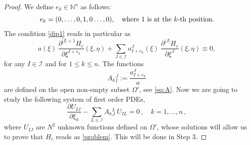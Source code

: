 \documentclass{article}
\newcommand{\I}{\mathcal{I}}
\newcommand{\de}{\partial}
\newcommand{\N}{\mathds{N}}
\begin{document}
\begin{proof}
\smallskip\noindent
We define $e_k\in\N^n$ as follows:
$$e_k=(0,\mathellipsis,0,1,0\mathellipsis,0),\quad \text{where $1$ is at the $k$-th position}.$$
The condition \eqref{dip1} reads in particular as 
\begin{equation}\label{dip}
a(\xi)\ \frac{\de^{|I|+1}H_c}{{\de\xi^{I+e_k}}}(\xi,\eta) + \sum_{J\in\mathcal{I}} a^J_{I+e_k}(\xi)\   \frac{\de^{|J|}H_c}{\de\xi^{J}} (\xi,\eta) \equiv 0,\end{equation}
for any $I\in\I$ and  for   $1\leq k \leq n$.
The functions 
$$
A_k{}^J_I:=\frac{a^J_{I+e_k}}{a}
$$
are defined on the open non-empty subset $\Omega'$, see \eqref{eq:A}.
Now we are going to study the following system of first order PDEs,
\begin{equation}\label{sistema}
\frac{\de U_{IJ}}{\de\xi_k}-\sum_{L\in\I}A_k{}^L_J \, U_{IL}=0\,,\quad k=1,\dots,n\,,
\end{equation}
where $U_{IJ}$ are $N^2$ unknown functions defined on $\Omega'$, whose solutions will allow us to prove that $H_c$ reads as \eqref{problem}.  This will be done  in Step 3.


\end{proof}
\end{document}

